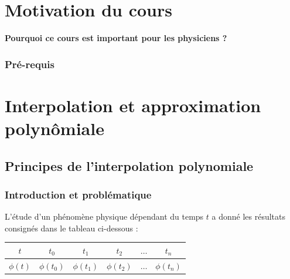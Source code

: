 
\chapter*{Motivation du cours}
\thispagestyle{plain}

\begin{center}
	\Large{\textbf{Pourquoi ce cours est important pour les physiciens ?}}
\end{center}






\subsection*{Pré-requis}


\tableofcontents
\newpage

\chapter{Interpolation et approximation polynômiale}
\section{Principes de l'interpolation polynomiale}

\subsection{Introduction et problématique}
L'étude d'un phénomène physique dépendant du temps $t$ a donné les résultats consignés dans le tableau ci-dessous :

\vspace{0.5cm} %
\begin{center}
	\begin{tabular}{c | c c c c c}
		$t$       & $t_0$ & $t_1$ & $t_2$ & $\dots$ & $t_n$ \\
		\hline
		$\phi(t)$ & $\phi(t_0)$ & $\phi(t_1)$ & $\phi(t_2)$ & $\dots$ & $\phi(t_n)$ \\
	\end{tabular}
\end{center}
\vspace{0.5cm}

